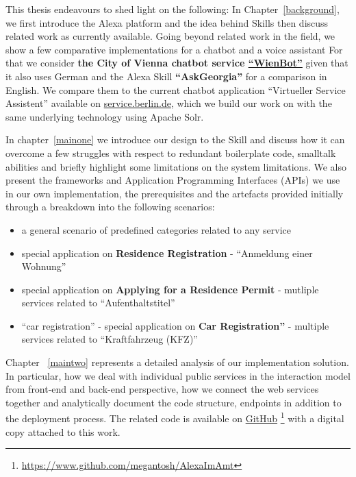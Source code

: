 This thesis endeavours to shed light on the following: In Chapter~\ref{background}, 
we first introduce the Alexa platform and the idea behind Skills then discuss related work as currently available. Going beyond related work in the field, we show a few comparative %
implementations for a chatbot and a voice assistant For that we consider \textbf{the City of Vienna chatbot service \href{https://www.wien.gv.at/bot/}{``WienBot''}} given that it also uses German and the Alexa Skill \textbf{``AskGeorgia''} for a comparison in English. We compare them to the current chatbot application ``Virtueller Service Assistent'' available on \href{https://service.berlin.de/virtueller-assistent/virtueller-assistent-606279.php}{service.berlin.de}, which we build our work on with the same underlying technology using Apache Solr.

In chapter~\ref{mainone} we introduce our design to the Skill and discuss how it can overcome a few struggles with respect to redundant boilerplate code, smalltalk abilities and briefly highlight some limitations on the system limitations. We also present the frameworks and Application Programming Interfaces (APIs) we use in our own implementation, the prerequisites and the artefacts provided initially through a breakdown into the following 
scenarios:
\begin{itemize}
	\item a general scenario of predefined categories related to any service 
	\item special application on \textbf{Residence Registration} - ``Anmeldung einer Wohnung''
	\item special application on \textbf{Applying for a Residence Permit} - mutliple services related to ``Aufenthaltstitel''
	\item ``car registration'' -  special application on \textbf{Car Registration''} - multiple services  related to ``Kraftfahrzeug (KFZ)''
\end{itemize}

Chapter ~\ref{maintwo} represents a detailed analysis of our implementation solution. In particular, how we deal with individual public services in the interaction model from front-end and back-end perspective, how we connect the web services together and analytically document the code structure, endpoints in addition to the deployment process. The related code is available on \href{https://www.github.com/megantosh/AlexaImAmt}{GitHub} \footnote{\url{https://www.github.com/megantosh/AlexaImAmt} } with a digital copy attached to this work. 

